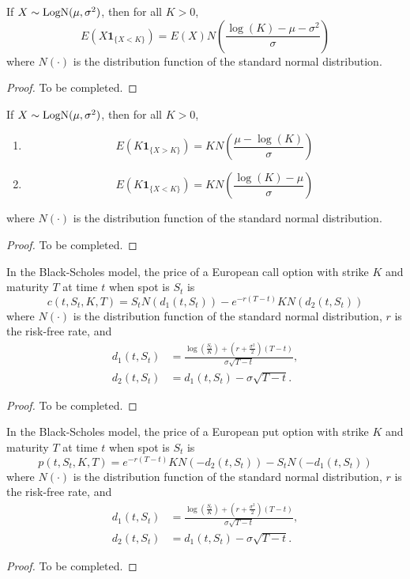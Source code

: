 \documentclass[11pt,fleqn]{book} %
\begin{document}
\begin{lemma} \label{lemma:4111}
If \(X \sim \operatorname{LogN}(\mu, \sigma^2)\), then for all \(K > 0\),
\[
E(X\mathbf{1}_{\{X < K\}}) = E(X)N\left(\frac{\log(K) - \mu - \sigma^2}{\sigma}\right)
\]
where \(N(\cdot)\) is the distribution function of the standard normal distribution.
\end{lemma}
\begin{proof} 
To be completed.
\end{proof}

\begin{lemma} \label{lemma:4112}
If \(X \sim \operatorname{LogN}(\mu, \sigma^2)\), then for all \(K > 0\),
\begin{enumerate}
\item 
\[
E(K\mathbf{1}_{\{X > K\}}) = KN\left(\frac{\mu - \log(K)}{\sigma}\right)
\]
\item
\[
E(K\mathbf{1}_{\{X < K\}}) = KN\left(\frac{\log(K) - \mu}{\sigma}\right)
\]
\end{enumerate}
where \(N(\cdot)\) is the distribution function of the standard normal distribution.
\end{lemma}
\begin{proof} 
To be completed.
\end{proof}

\begin{theorem} \label{thm:4113}
In the Black-Scholes model, the price of a European call option with strike \(K\) and maturity \(T\) at time \(t\) when spot is \(S_t\) is
\[
c(t, S_t, K, T) = S_tN(d_1(t, S_t)) - e^{-r(T - t)}KN(d_2(t, S_t))
\]
where \(N(\cdot)\) is the distribution function of the standard normal distribution, \(r\) is the risk-free rate, and
\[
\begin{aligned}
d_1(t, S_t) &= \frac{\log\left(\frac{S_t}{K}\right) + \left(r + \frac{\sigma^2}{2}\right)(T - t)}{\sigma\sqrt{T - t}}, \\
d_2(t, S_t) &= d_1(t, S_t) - \sigma\sqrt{T - t}.
\end{aligned}
\]
\end{theorem}
\begin{proof}
To be completed.
\end{proof}

\begin{corollary} \label{cor:4114}
In the Black-Scholes model, the price of a European put option with strike \(K\) and maturity \(T\) at time \(t\) when spot is \(S_t\) is
\[
p(t, S_t, K, T) = e^{-r(T - t)}KN(-d_2(t, S_t)) - S_tN(-d_1(t, S_t))
\]
where \(N(\cdot)\) is the distribution function of the standard normal distribution, \(r\) is the risk-free rate, and
\[
\begin{aligned}
d_1(t, S_t) &= \frac{\log\left(\frac{S_t}{K}\right) + \left(r + \frac{\sigma^2}{2}\right)(T - t)}{\sigma\sqrt{T - t}}, \\
d_2(t, S_t) &= d_1(t, S_t) - \sigma\sqrt{T - t}.
\end{aligned}
\]
\end{corollary}
\begin{proof}
To be completed.
\end{proof}
\end{document}
